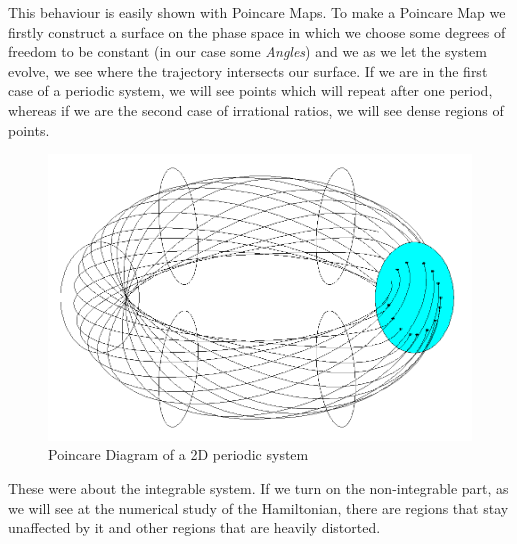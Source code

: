 	This behaviour is easily shown with Poincare Maps. To make a Poincare Map we firstly construct a surface on the phase space in which we choose some degrees of freedom to be constant (in our case some \textit{Angles}) and we as we let the system evolve, we see where the trajectory intersects our surface. If we are in the first case of a periodic system, we will see points which will repeat after one period, whereas if we are the second case of irrational ratios, we will see dense regions of points.  
		\begin{figure}[h!]
			\centering 
			\includegraphics[scale=0.3]{Theory/poin.png}
			\caption{Poincare Diagram of a 2D periodic system}
			\label{fig1}
		\end{figure}
		
	These were about the integrable system. If we turn on the non-integrable part, as we will see at the numerical study of the Hamiltonian, there are regions that stay unaffected by it and other regions that are heavily distorted.